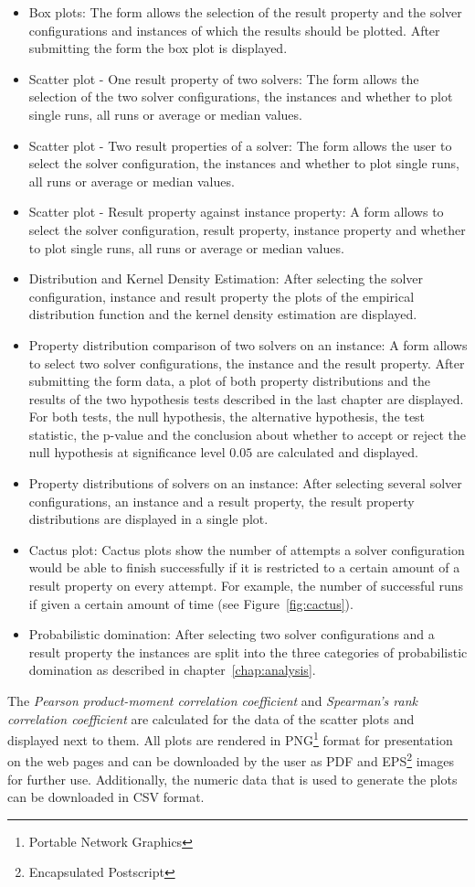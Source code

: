 \begin{itemize}
\item Box plots: The form allows the selection of the result property and the solver configurations and instances of which the results should be plotted. After submitting the form the box plot is displayed.
\item Scatter plot - One result property of two solvers: The form allows the selection of the two solver configurations, the instances and whether to plot single runs, all runs or average or median values.
\item Scatter plot - Two result properties of a solver: The form allows the user to select the solver configuration, the instances and whether to plot single runs, all runs or average or median values.
\item Scatter plot - Result property against instance property: A form allows to select the solver configuration, result property, instance property and whether to plot single runs, all runs or average or median values.
\item Distribution and Kernel Density Estimation: After selecting the solver configuration, instance and result property the plots of the empirical distribution function and the kernel density estimation are displayed.
\item Property distribution comparison of two solvers on an instance: A form allows to select two solver configurations, the instance and the result property. After submitting the form data, a plot of both property distributions and the results of the two hypothesis tests described in the last chapter are displayed. For both tests, the null hypothesis, the alternative hypothesis, the test statistic, the p-value and the conclusion about whether to accept or reject the null hypothesis at significance level $0.05$ are calculated and displayed.
\item Property distributions of solvers on an instance: After selecting several solver configurations, an instance and a result property, the result property distributions are displayed in a single plot.
\item Cactus plot: Cactus plots show the number of attempts a solver configuration would be able to finish successfully if it is restricted to a certain amount of a result property on every attempt. For example, the number of successful runs if given a certain amount of time (see Figure~\ref{fig:cactus}).
\item Probabilistic domination: After selecting two solver configurations and a result property the instances are split into the three categories of probabilistic domination as described in chapter~\ref{chap:analysis}.
\end{itemize}
The \emph{Pearson product-moment correlation coefficient} and \emph{Spearman's rank correlation coefficient} are calculated for the data of the scatter plots and displayed next to them.
All plots are rendered in PNG\footnote{Portable Network Graphics} format for presentation on the web pages and can be downloaded by the user as PDF and EPS\footnote{Encapsulated Postscript} images
for further use. Additionally, the numeric data that is used to generate the plots can be downloaded in CSV format.
